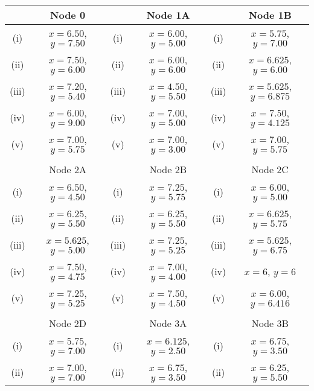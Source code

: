\documentclass[a4paper,12pt]{article}
\begin{document}
	\normalsize	
	\begin{tabular}{||c|c||c|c||c|c||}
		\hline  & Node 0 &   & Node 1A &  & Node 1B     \\  \hline
		\hline (i) & $x= 6.50$, $y= 7.50$ & (i) & $x= 6.00$, $y= 5.00$ &  (i)  & $x= 5.75$, $y = 7.00$\\  \hline
		\hline (ii)  & $x= 7.50$, $y= 6.00$  &  (ii) & $x= 6.00$, $y= 6.00$ & (ii) & $x= 6.625$, $y = 6.00 $ \\  \hline
		\hline (iii) & $x= 7.20$, $y = 5.40$  & (iii) & $x= 4.50$, $y = 5.50$ & (iii) & $x= 5.625$, $y = 6.875$ \\  \hline
		\hline (iv)  & $x= 6.00$, $y =9.00 $  &  (iv) & $x= 7.00$, $y = 5.00 $ & (iv)  & $x= 7.50$, $y= 4.125$\\  \hline
		\hline (v) & $x= 7.00$, $y= 5.75$ & (v)  & $x= 7.00$, $y= 3.00$ & (v) & $x= 7.00$, $y= 5.75$\\  \hline & & & & & \\
		\hline 
		\hline  & Node 2A &   & Node 2B &  & Node 2C  \\  \hline
		\hline (i) & $x= 6.50$, $y= 4.50$ & (i)  & $x= 7.25 $, $y = 5.75 $  & (i)  & $x= 6.00$, $y = 5.00$\\  \hline
		\hline (ii)  & $x= 6.25$, $y= 5.50$  &  (ii) &$x= 6.25$, $y= 5.50$ & (ii) & $x= 6.625$, $y = 5.75 $ \\  \hline
		\hline (iii) & $x= 5.625  $, $y = 5.00 $  &  (iii) &$x= 7.25 $, $y = 5.25 $ &  (iii) & $x= 5.625$, $y = 6.75$ \\  \hline
		\hline (iv)  & $x= 7.50$, $y = 4.75 $  & (iv) & $x= 7.00 $, $y = 4.00 $ & (iv)  & $x= 6$, $y = 6$\\  \hline
		\hline (v) & $x= 7.25 $, $y = 5.25 $ & (v) & $x= 7.50$, $y= 4.50$  &(v) & $x= 6.00$, $y= 6.416$\\  \hline & & & & & \\
		\hline 
		\hline  & Node 2D &   & Node 3A &  & Node 3B   \\  \hline
		\hline (i) & $x= 5.75$, $y= 7.00$ &  (i) & $x= 6.125$, $y= 2.50$  & (i)  & $x= 6.75$, $y= 3.50$\\  \hline
		\hline (ii)  & $x= 7.00$, $y = 7.00$  &  (ii) & $x= 6.75$, $y= 3.50$ & (ii) & $x= 6.25$, $y= 5.50$ \\  \hline

\end{tabular}
\end{document}
